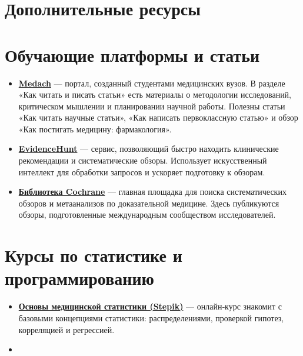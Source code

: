 \documentclass[
  russian,
  letterpaper,
]{book}
\providecommand{\tightlist}{%
  \setlength{\itemsep}{0pt}\setlength{\parskip}{0pt}}
\begin{document}
\chapter{Дополнительные
ресурсы}\label{ux434ux43eux43fux43eux43bux43dux438ux442ux435ux43bux44cux43dux44bux435-ux440ux435ux441ux443ux440ux441ux44b}

\chapter{Обучающие платформы и статьи}\label{sec-resources}

\begin{itemize}
\item
  \href{https://medach.pro}{\textbf{Medach}} --- портал, созданный
  студентами медицинских вузов. В разделе «Как читать и писать статьи»
  есть материалы о методологии исследований, критическом мышлении и
  планировании научной работы. Полезны статьи «Как читать научные
  статьи», «Как написать первоклассную статью» и обзор «Как постигать
  медицину: фармакология».
\item
  \href{https://evidencehunt.com}{\textbf{EvidenceHunt}} --- сервис,
  позволяющий быстро находить клинические рекомендации и систематические
  обзоры. Использует искусственный интеллект для обработки запросов и
  ускоряет подготовку к обзорам.
\item
  \href{https://www.cochranelibrary.com}{\textbf{Библиотека Cochrane}}
  --- главная площадка для поиска систематических обзоров и метаанализов
  по доказательной медицине. Здесь публикуются обзоры, подготовленные
  международным сообществом исследователей.
\end{itemize}

\chapter{Курсы по статистике и
программированию}\label{ux43aux443ux440ux441ux44b-ux43fux43e-ux441ux442ux430ux442ux438ux441ux442ux438ux43aux435-ux438-ux43fux440ux43eux433ux440ux430ux43cux43cux438ux440ux43eux432ux430ux43dux438ux44e}

\begin{itemize}
\tightlist
\item
  \href{https://stepik.org/course/Основы-медицинской-статистики-1253}{\textbf{Основы
  медицинской статистики (Stepik)}} --- онлайн‑курс знакомит с базовыми
  концепциями статистики: распределениями, проверкой гипотез,
  корреляцией и регрессией.
\item
\end{itemize}
\end{document}
